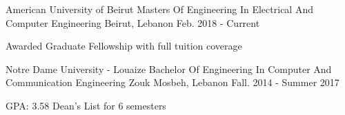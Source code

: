 

\begin{cventries}

  \cventry
    {American University of Beirut} %
    {Masters Of Engineering In Electrical And Computer Engineering} %
    {Beirut, Lebanon} %
    {Feb. 2018 - Current} %
    {
      \begin{cvitems} %
        \item {Awarded Graduate Fellowship with full tuition coverage }
      \end{cvitems}
    }

  \cventry
    {Notre Dame University - Louaize} %
    {Bachelor Of Engineering In Computer And Communication Engineering} %
    {Zouk Mosbeh, Lebanon} %
    {Fall. 2014 - Summer 2017} %
    {
      \begin{cvitems} %
        \item {GPA: 3.58 Dean’s List for 6 semesters}
      \end{cvitems}
    }




\end{cventries}
